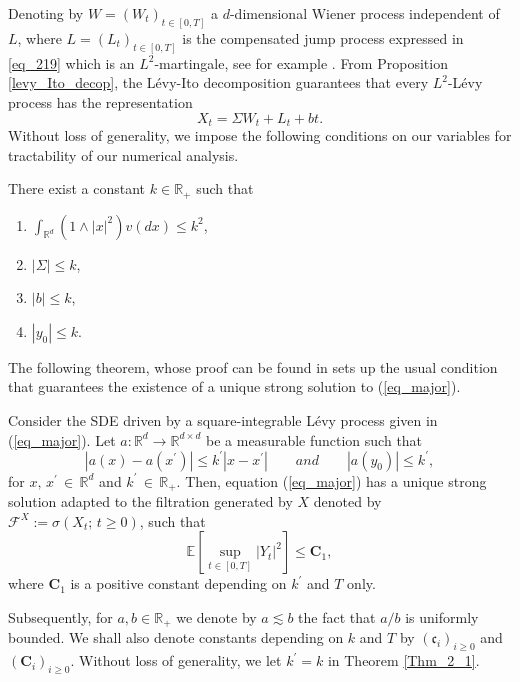 Denoting by $W=(W_t)_{t\in [0,T]} $ a $d$-dimensional Wiener process independent of $L$, where $L=(L_t)_{t\in [0,T]}$ is the compensated jump process expressed in \eqref{eq_219} which is an \break $L^2$-martingale, see for example . From Proposition \ref{levy_Ito_decop}, the L\'evy-Ito decomposition guarantees that every  $L^2$-L\'evy process has the representation 
\begin{equation}\label{eq_4}
X_t = \Sigma W_t + L_t + bt.
\end{equation}
Without loss of generality, we impose the following conditions on our variables for tractability of our numerical analysis. 
\begin{assumption}\label{Assumption_1}
There exist a constant $k \in \mathbb{R}_+$ such that 
\begin{enumerate}[label=(\roman*)]
        \item $\int_{\mathbb{R}^d} (1 \land |x|^2)  v(dx) \leq k^2$,
        \item $|\Sigma|\leq k$,
        \item $|b|\leq k$,
        \item $|y_0|\leq k$.
   \end{enumerate}
\end{assumption}
The following theorem, whose proof can be found in  sets up the usual condition that guarantees the existence of a unique strong solution to (\ref{eq_major}).
\begin{theorem}\label{Thm_2_1}
Consider the SDE driven by a \break square-integrable L\'evy process given in (\ref{eq_major}). Let $a : \mathbb{R}^d \to \mathbb{R}^{d \times d}$ be a measurable function such that 
\begin{equation*}
    |a(x) - a(x^{\prime})| \leq k^{\prime} |x - x^{\prime}| \qquad and \qquad |a(y_0)|\leq k^{\prime},
\end{equation*}
    for $x, \, x^{\prime} \, \in \, \mathbb{R}^d$ and $k^{\prime} \, \in \, \mathbb{R}_+$. Then, equation (\ref{eq_major}) has a unique strong solution adapted to the filtration generated by $X$ denoted by $\mathcal{F}^X := \sigma(X_t; \, t \geq 0)$, such that 
    \begin{equation*}
        \mathbb{E}[\sup_{t \in [0, T]}|Y_t|^2] \leq \mathbf{C}_1,
    \end{equation*}
    where $\mathbf{C}_1$ is a positive constant depending on $k^{\prime}$ and $T$ only.
\end{theorem}
\begin{remark}
Subsequently, for $a, b \in \mathbb{R}_+$ we denote by $a \lesssim b$ the fact that $a/b$ is uniformly bounded. We shall also denote constants depending on $k$ and $T$ by $(\mathfrak{c}_i)_{i \geq 0}$ and  $(\mathbf{C}_i)_{i \geq 0}$. Without loss of generality, we let $k^{\prime} = k$ in Theorem \ref{Thm_2_1}.
\end{remark}
